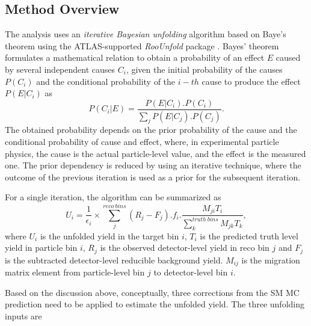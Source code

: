 \subsection{Method Overview}
\label{subsec:UnfoldingOverview}
The analysis uses an \textit{iterative Bayesian unfolding} algorithm based on Baye's theorem \cite{BayesianUnfolding} \cite{Improved_BayesianUnfolding} using the ATLAS-supported \textit{RooUnfold} package \cite{RooUnfold}. Bayes' theorem formulates a mathematical relation to obtain a probability of an effect $E$ caused by several independent causes $C_{i}$, given the initial probability of the causes $P(C_{i})$ and the conditional probability of the $i-th$ cause to produce the effect $P(E|C_{i})$ as 
\begin{equation}
P(C_{i}|E) = \frac{ P(E|C_{i}) . P(C_{i}) } { \sum_{j}{ P(E|C_{j}).P(C_{j}) } }.
\label{eqn:BayesTheorem}
\end{equation}
The obtained probability depends on the prior probability of the cause and the conditional probability of cause and effect, where, in experimental particle physics, the cause is the actual particle-level value, and the effect is the measured one. The prior dependency is reduced by using an iterative technique, where the outcome of the previous iteration is used as a prior for the subsequent iteration.

For a single iteration, the algorithm can be summarized as 
\begin{equation}
    U_{i} = \frac{1}{ \epsilon_{i} } \times \sum^{reco~bins}_{j}{ (R_j -F_j ) . f_{i} . \frac{M_{ji} T_{i}}{ \sum_{k}^{truth~bins}{M_{jk} T_{k}}} },
    \label{eqn:BayesianUnfolding}
\end{equation}
where $U_{i}$ is the unfolded yield in the target bin $i$, $T_{i}$ is the predicted truth level yield in particle bin $i$, $R_{j}$ is the observed detector-level yield in reco bin $j$ and $F_{j}$ is the subtracted detector-level reducible background yield. $M_{ij}$ is the migration matrix element from particle-level bin $j$ to detector-level bin $i$. 

Based on the discussion above, conceptually, three corrections from the SM MC prediction need to be applied to estimate the unfolded yield. The three unfolding inputs are 

